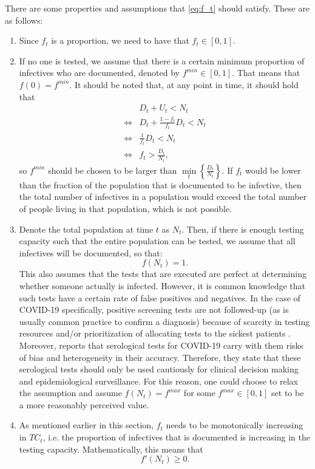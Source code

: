 \documentclass[12pt]{article}
\begin{document}
	There are some properties and assumptions that \eqref{eq:f_t} should satisfy. These are as follows:
	\begin{enumerate}[label=(A\arabic*)]
		\item\label{ass:undoc_proportion} Since $f_t$ is a proportion, we need to have that $f_t \in [0,1]$.
		\item\label{ass:undoc_f0} If no one is tested, we assume that there is a certain minimum proportion of infectives who are documented, denoted by $f^{min} \in [0,1]$. That means that $f(0) = f^{min}$. It should be noted that, at any point in time, it should hold that
    	    \begin{align*}
        	    & D_t + U_t < N_t \\
        	    \iff & D_t + \frac{1-f_t}{f_t}D_t < N_t \\
        	    \iff & \frac{1}{f_t}D_t < N_t \\
        	    \iff & f_t > \frac{D_t}{N_t},
    	    \end{align*}
		so $f^{min}$ should be chosen to be larger than $\min\limits_{t}\left\{\frac{D_t}{N_t}\right\}$. If $f_t$ would be lower than the fraction of the population that is documented to be infective, then the total number of infectives in a population would exceed the total number of people living in that population, which is not possible.
		
		\item\label{ass:undoc_fN} Denote the total population at time $t$ as $N_t$. Then, if there is enough testing capacity such that the entire population can be tested, we assume that all infectives will be documented, so that:
		    \[f(N_t) = 1.\]
		This also assumes that the tests that are executed are perfect at determining whether someone actually is infected. However, it is common knowledge that such tests have a certain rate of false positives and negatives. In the case of COVID-19 specifically, positive screening tests are not followed-up (as is usually common practice to confirm a diagnosis) because of scarcity in testing resources and/or prioritization of allocating tests to the sickest patients \parencite{frasier2020tests}. Moreover, \textcite{bmj2020testaccuracy} reports that serological tests for COVID-19 carry with them risks of bias and heterogeneity in their accuracy. Therefore, they state that these serological tests should only be used cautiously for clinical decision making and epidemiological surveillance. For this reason, one could choose to relax the assumption and assume $f(N_t) = f^{max}$ for some $f^{max} \in [0,1]$ set to be a more reasonably perceived value.
		
		\item\label{ass:undoc_monotonicity} As mentioned earlier in this section, $f_t$ needs to be monotonically increasing in $TC_t$, i.e. the proportion of infectives that is documented is increasing in the testing capacity. Mathematically, this means that
		    \[f'(N_t) \geq 0.\]
	\end{enumerate}
	
\end{document}
